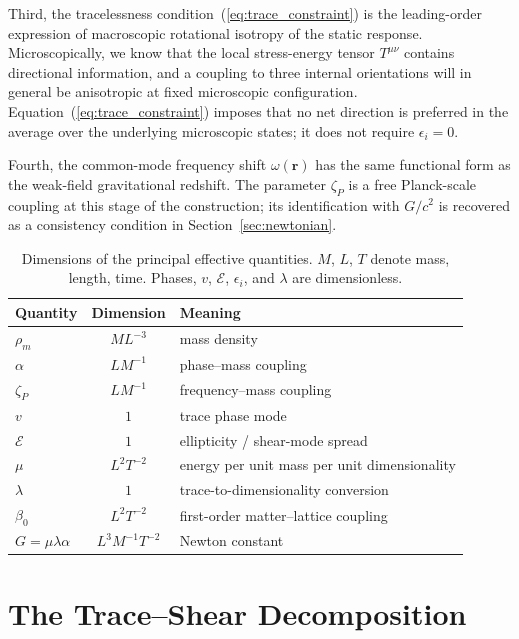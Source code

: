 \documentclass[a4paper,fleqn]{cas-dc}
\theoremstyle{thmstyleone}%
\theoremstyle{thmstyletwo}%
\begin{document}
Third, the tracelessness
condition~(\ref{eq:trace_constraint}) is the leading-order
expression of macroscopic rotational isotropy of the static
response. Microscopically, we know that the local stress-energy tensor
$T^{\mu\nu}$ contains directional information, and a coupling
to three internal orientations will in general be anisotropic
at fixed microscopic configuration. Equation~(\ref{eq:trace_constraint}) imposes that no net direction is
preferred in the average over the underlying microscopic
states; it does not require $\epsilon_i=0$.

Fourth, the common-mode frequency shift
$\omega(\mathbf{r})$ has the same functional form as the
weak-field gravitational redshift. The parameter $\zeta_P$ is a
free Planck-scale coupling at this stage of the construction;
its identification with $G/c^2$ is recovered as a consistency
condition in Section~\ref{sec:newtonian}.

\begin{table}[h]
\caption{Dimensions of the principal effective quantities. $M$,
$L$, $T$ denote mass, length, time. Phases, $v$,
$\mathcal{E}$, $\epsilon_i$, and $\lambda$ are dimensionless.}
\centering
\begin{tabular}{l c l}
\hline
Quantity & Dimension & Meaning \\
\hline
$\rho_m$ & $ML^{-3}$ & mass density \\
$\alpha$ & $LM^{-1}$ & phase--mass coupling \\
$\zeta_P$ & $LM^{-1}$ & frequency--mass coupling \\
$v$ & $1$ & trace phase mode  \\
$\mathcal{E}$ & $1$ & ellipticity / shear-mode spread \\
$\mu$ & $L^2T^{-2}$ & energy per unit mass per unit dimensionality \\
$\lambda$ & $1$ & trace-to-dimensionality conversion \\
$\beta_0$ & $L^2T^{-2}$ & first-order matter--lattice coupling \\
$G=\mu\lambda\alpha$ & $L^3M^{-1}T^{-2}$ & Newton constant \\
\hline
\end{tabular}
\label{tab:dimensions}
\end{table}

\section{The Trace--Shear Decomposition}
\label{sec:decomposition}
\end{document}
